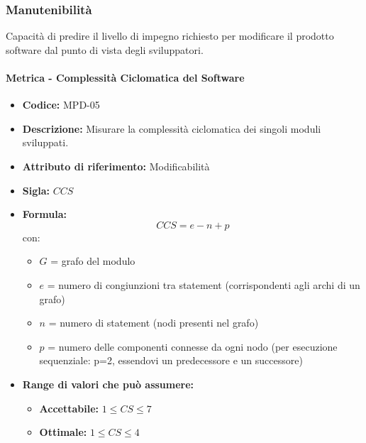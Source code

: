 \subsubsection{Manutenibilità} 
Capacità di predire il livello di impegno richiesto per modificare il prodotto software dal punto di vista degli sviluppatori.           
\paragraph{Metrica - Complessità Ciclomatica del Software} 
    \begin{itemize}
    \item \textbf{Codice:} MPD-05
    \item \textbf{Descrizione:} Misurare la complessità ciclomatica dei singoli moduli sviluppati.
    \item \textbf{Attributo di riferimento:} Modificabilità
    \item \textbf{Sigla:} $CCS$
    \item \textbf{Formula:} $$CCS = e - n + p$$
    con:
    \begin{itemize}
        \item $G$ = grafo del modulo
        \item $e$ = numero di congiunzioni tra statement (corrispondenti agli archi di un grafo)
        \item $n$ = numero di statement (nodi presenti nel grafo)
        \item $p$ = numero delle componenti connesse da ogni nodo (per esecuzione sequenziale: p=2, essendovi un predecessore e un successore)
    \end{itemize}

    \item \textbf{Range di valori che può assumere:}
    \begin{itemize}
        \item \textbf{Accettabile:} $1 \leq CS \leq 7 $
        \item \textbf{Ottimale:} $ 1 \leq CS \leq 4 $
    \end{itemize}
\end{itemize}


